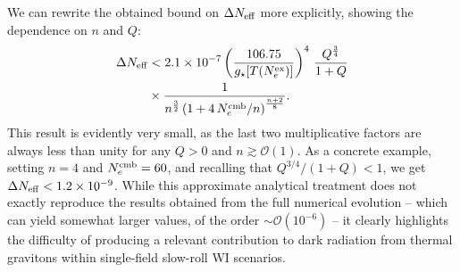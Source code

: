 We can rewrite the obtained bound on $\Delta N_{\rm eff}$ more explicitly, showing the dependence on $n$ and $Q$:
\begin{align}
    \Delta N_{\rm eff}&< 2.1\times 10^{-7} \left( \frac{106.75}{g_\star[T(N_e^{\rm ex})]}\right)^4\,\frac{Q^{\frac{3}{4}}}{1+Q} \nonumber \\
&\times \frac{1}{n^{\frac{3}{2}}\left(1+4\,N_e^{\rm cmb}/n\right)^{\frac{n+2}{8}}}.
\end{align}
This result is evidently very small, as the last two multiplicative factors are always less than unity for any $Q>0$ and $n \gtrsim \mathcal{O}(1)$. As a concrete example, setting $n=4$ and $N_e^{\rm cmb}=60$, and recalling that $Q^{3/4}/(1+Q)<1$, we get $\Delta N_{\rm eff}<  1.2\times 10^{-9}$. While this approximate analytical treatment does not exactly reproduce the results obtained from the full numerical evolution -- which can yield somewhat larger values, of the order $\sim\mathcal{O}(10^{-6})$ -- it clearly highlights the difficulty of producing a relevant contribution to dark radiation from thermal gravitons within single-field slow-roll WI scenarios.


